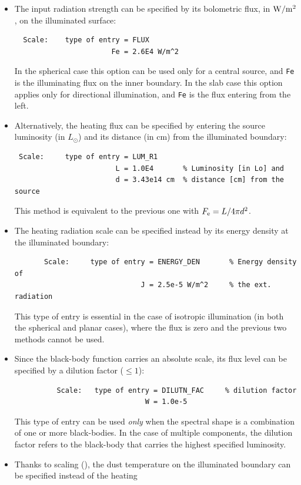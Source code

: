 \documentclass[11pt]{article}
\def\Lo     {\hbox{$L_{\odot}$}}
\begin{document}
\begin{itemize}
%
\item The input radiation strength can be specified by its bolometric
  flux, in $\rm W/m^2$, on the illuminated surface:
\begin{verbatim}
  Scale:    type of entry = FLUX
                       Fe = 2.6E4 W/m^2
\end{verbatim}
  In the spherical case this option can be used only for a central
  source, and {\tt Fe} is the illuminating flux on the inner
  boundary. In the slab case this option applies only for directional
  illumination, and {\tt Fe} is the flux entering from the left.
%
\item Alternatively, the heating flux can be specified by entering the
  source luminosity (in \Lo) and its distance (in cm) from the
  illuminated boundary:
\begin{verbatim}
 Scale:     type of entry = LUM_R1
                        L = 1.0E4       % Luminosity [in Lo] and
                        d = 3.43e14 cm  % distance [cm] from the source
\end{verbatim}
  This method is equivalent to the previous one with $F_{\rm e} =
  L/4\pi d^2$.
%
\item The heating radiation scale can be specified instead by its
  energy density at the illuminated boundary:
\begin{verbatim}
       Scale:     type of entry = ENERGY_DEN       % Energy density of
                              J = 2.5e-5 W/m^2     % the ext. radiation
\end{verbatim}
  This type of entry is essential in the case of isotropic
  illumination (in both the spherical and planar cases), where the
  flux is zero and the previous two methods cannot be used.
%
\item Since the black-body function carries an absolute scale, its
  flux level can be specified by a dilution factor ($\le 1$):
\begin{verbatim}
          Scale:   type of entry = DILUTN_FAC     % dilution factor
                               W = 1.0e-5
\end{verbatim}
  This type of entry can be used {\em only} when the spectral shape is
  a combination of one or more black-bodies. In the case of multiple
  components, the dilution factor refers to the black-body that
  carries the highest specified luminosity.
%
\item Thanks to scaling (\cite{IE97}), the dust temperature on the
  illuminated boundary can be specified instead of the heating

\end{itemize}
\end{document}
